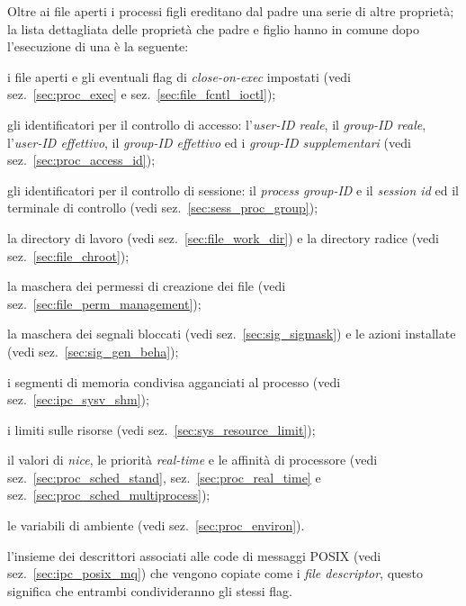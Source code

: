 Oltre ai file aperti i processi figli ereditano dal padre una serie di altre
proprietà; la lista dettagliata delle proprietà che padre e figlio hanno in
comune dopo l'esecuzione di una  è la seguente:
\begin{itemize*}
\item i file aperti e gli eventuali flag di \textit{close-on-exec} impostati
  (vedi sez.~\ref{sec:proc_exec} e sez.~\ref{sec:file_fcntl_ioctl});
\item gli identificatori per il controllo di accesso: l'\textsl{user-ID
    reale}, il \textsl{group-ID reale}, l'\textsl{user-ID effettivo}, il
  \textsl{group-ID effettivo} ed i \textsl{group-ID supplementari} (vedi
  sez.~\ref{sec:proc_access_id});
\item gli identificatori per il controllo di sessione: il \textit{process
    group-ID} e il \textit{session id} ed il terminale di controllo (vedi
  sez.~\ref{sec:sess_proc_group});
\item la directory di lavoro (vedi sez.~\ref{sec:file_work_dir}) e la
  directory radice (vedi sez.~\ref{sec:file_chroot});
\item la maschera dei permessi di creazione dei file (vedi
  sez.~\ref{sec:file_perm_management});
\item la maschera dei segnali bloccati (vedi
  sez.~\ref{sec:sig_sigmask}) e le azioni installate (vedi
  sez.~\ref{sec:sig_gen_beha});
\item i segmenti di memoria condivisa agganciati al processo (vedi
  sez.~\ref{sec:ipc_sysv_shm});
\item i limiti sulle risorse (vedi sez.~\ref{sec:sys_resource_limit});
\item il valori di \textit{nice}, le priorità \textit{real-time} e le affinità
  di processore (vedi sez.~\ref{sec:proc_sched_stand},
  sez.~\ref{sec:proc_real_time} e sez.~\ref{sec:proc_sched_multiprocess});
\item le variabili di ambiente (vedi sez.~\ref{sec:proc_environ}).
\item l'insieme dei descrittori associati alle code di messaggi POSIX (vedi
  sez.~\ref{sec:ipc_posix_mq}) che vengono copiate come i \textit{file
    descriptor}, questo significa che entrambi condivideranno gli stessi flag.
\end{itemize*}

